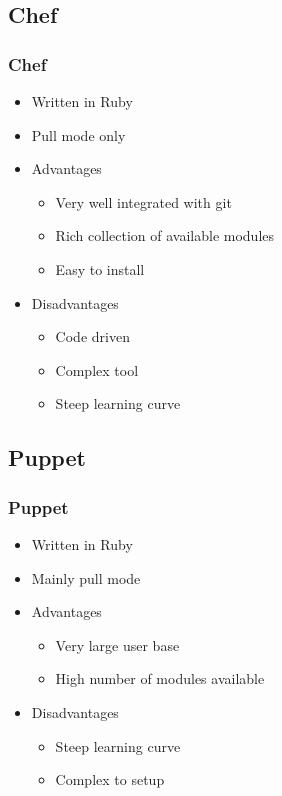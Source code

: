\documentclass[t,aspectratio=169]{beamer}
\begin{document}
\subsection{Chef}
\begin{frame}
    \frametitle{Chef}
    \begin{itemize}
        \item<2-> Written in Ruby 
        \item<3-> Pull mode only
        \item<4-> Advantages
        \begin{itemize}
            \item<5-> Very well integrated with git
            \item<6-> Rich collection of available modules
            \item<7-> Easy to install
        \end{itemize}
        \item<8-> Disadvantages
        \begin{itemize}
            \item<9-> Code driven
            \item<10-> Complex tool
            \item<11-> Steep learning curve
        \end{itemize}
    \end{itemize}
\end{frame}

\subsection{Puppet}
\begin{frame}
    \frametitle{Puppet}
    \begin{itemize}
        \item<2-> Written in Ruby
        \item<3-> Mainly pull mode
        \item<4-> Advantages
        \begin{itemize}
            \item<5-> Very large user base
            \item<6-> High number of modules available
        \end{itemize}
        \item<7-> Disadvantages
        \begin{itemize}
            \item<8-> Steep learning curve
            \item<9-> Complex to setup
        \end{itemize}
    \end{itemize}
\end{frame}
\end{document}
